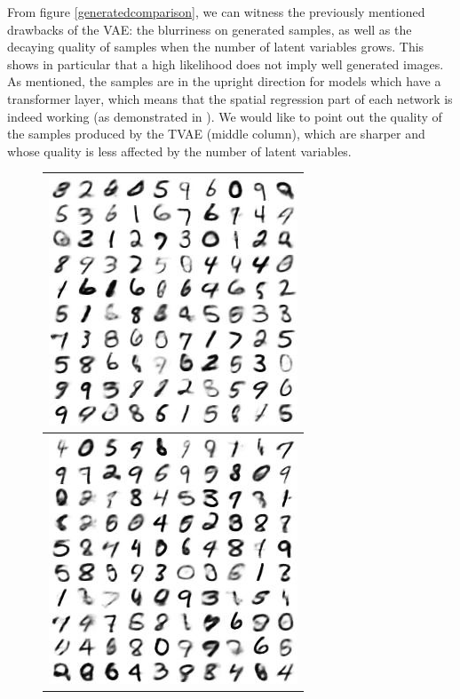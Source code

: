 \documentclass[letterpaper, twoside]{article}
\begin{document}
From figure \ref{generatedcomparison}, we can witness the previously mentioned drawbacks of the VAE: the blurriness on generated samples, as well as the decaying quality of samples when the number of latent variables grows. This shows in particular that a high likelihood does not imply well generated images. As mentioned, the samples are in the upright direction for models which have a transformer layer, which means that the spatial regression part of each network is indeed working (as demonstrated in \cite{Siyu:vae}). We would like to point out the quality of the samples produced by the TVAE (middle column), which are sharper and whose quality is less affected by the number of latent variables.\\

\begin{figure}[H] 
\centering
\begin{minipage}{.33\textwidth}
\begin{flushleft}
\begin{tabular}{|@{}c@{}|}\hline
\includegraphics[scale=1]{manifold_119.jpg}\\ \hline
\includegraphics[scale=1]{manifold_120.jpg}\\\hline

\end{tabular}
\end{flushleft}
\end{minipage}
\end{figure}
\end{document}
